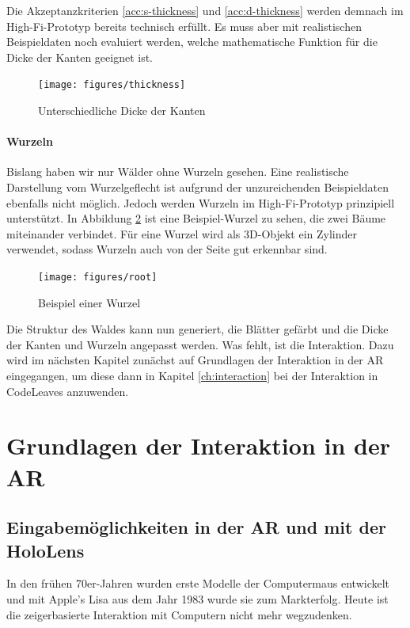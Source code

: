 Die Akzeptanzkriterien \ref{acc:s-thickness} und \ref{acc:d-thickness} werden demnach im High-Fi-Prototyp bereits technisch erfüllt. Es muss aber mit realistischen Beispieldaten noch evaluiert werden, welche mathematische Funktion für die Dicke der Kanten geeignet ist.

\begin{figure}[htb]
  \texttt{[image: figures/thickness]}
  \caption{Unterschiedliche Dicke der Kanten}
  \label{fig:thickness}
\end{figure}

\subsubsection*{Wurzeln}

Bislang haben wir nur Wälder ohne Wurzeln gesehen. Eine realistische Darstellung vom Wurzelgeflecht ist aufgrund der unzureichenden Beispieldaten ebenfalls nicht möglich. Jedoch werden Wurzeln im High-Fi-Prototyp prinzipiell  unterstützt. In Abbildung \ref{fig:root} ist eine Beispiel-Wurzel zu sehen, die zwei Bäume miteinander verbindet. Für eine Wurzel wird als 3D-Objekt ein Zylinder verwendet, sodass Wurzeln auch von der Seite gut erkennbar sind.

\begin{figure}[htb]
  \texttt{[image: figures/root]}
  \caption{Beispiel einer Wurzel}
  \label{fig:root}
\end{figure}

Die Struktur des Waldes kann nun generiert, die Blätter gefärbt und die Dicke der Kanten und Wurzeln angepasst werden. Was fehlt, ist die Interaktion. Dazu wird im nächsten Kapitel zunächst auf Grundlagen der Interaktion in der AR eingegangen, um diese dann in Kapitel \ref{ch:interaction} bei der Interaktion in CodeLeaves anzuwenden.

\chapter{Grundlagen der Interaktion in der AR}
\label{ch:interaction-ar}

\section{Eingabemöglichkeiten in der AR und mit der HoloLens}
\label{sec:interaction-hololens}

In den frühen 70er-Jahren wurden erste Modelle der Computermaus entwickelt und mit Apple's Lisa aus dem Jahr 1983 wurde sie zum Markterfolg. Heute ist die zeigerbasierte Interaktion mit Computern nicht mehr wegzudenken.

